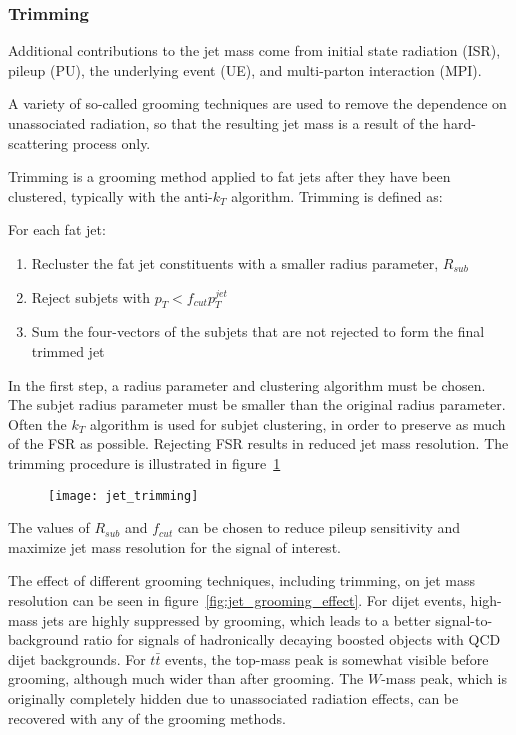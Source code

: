 \subsubsection{Trimming}

Additional contributions to the jet mass come from initial state radiation (ISR),
pileup (PU), the underlying event (UE), and multi-parton interaction (MPI).

A variety of so-called grooming techniques are used to remove the dependence on unassociated radiation,
so that the resulting jet mass is a result of the hard-scattering process only.

Trimming is a grooming method applied to fat jets after they have been clustered, typically with the anti-$k_T$ algorithm.
Trimming is defined as:

For each fat jet:
\begin{enumerate}
    \item Recluster the fat jet constituents with a smaller radius parameter, $R_{sub}$
    \item Reject subjets with $p_{T} < f_{cut} p_T^{jet}$
    \item Sum the four-vectors of the subjets that are not rejected to form the final trimmed jet
\end{enumerate}

In the first step, a radius parameter and clustering algorithm must be chosen.
The subjet radius parameter must be smaller than the original radius parameter.
Often the $k_T$ algorithm is used for subjet clustering, in order to preserve as much of the FSR as possible.
Rejecting FSR results in reduced jet mass resolution.\cite{jet-tasi-substructure}
The trimming procedure is illustrated in figure~\ref{fig:jet_trimming}

\begin{figure}[h!]
    \centering
\texttt{[image: jet\_trimming]}
\caption{}
\label{fig:jet_trimming}
\end{figure}

The values of $R_{sub}$ and $f_{cut}$ can be chosen to reduce pileup sensitivity and maximize jet mass resolution for the signal of interest.

The effect of different grooming techniques, including trimming, on jet mass resolution can be seen in figure~\ref{fig:jet_grooming_effect}.
For dijet events, high-mass jets are highly suppressed by grooming, which leads to a better signal-to-background ratio
for signals of hadronically decaying boosted objects with QCD dijet backgrounds.
For $t\bar{t}$ events, the top-mass peak is somewhat visible before grooming, although much wider than after grooming.
The $W$-mass peak, which is originally completely hidden due to unassociated radiation effects,
can be recovered with any of the grooming methods.

